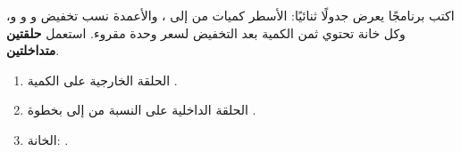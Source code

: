 \begin{statement}
اكتب برنامجًا يعرض جدولًا ثنائيًا: الأسطر كميات من  إلى ، والأعمدة نسب تخفيض  و و و، وكل خانة تحتوي ثمن الكمية بعد التخفيض لسعر وحدة مقروء. استعمل \textbf{حلقتين متداخلتين}.
\end{statement}
\begin{stepsbox}\begin{enumerate}
\item الحلقة الخارجية على الكمية .
\item الحلقة الداخلية على النسبة  من  إلى  بخطوة .
\item الخانة: .
\end{enumerate}\end{stepsbox}
